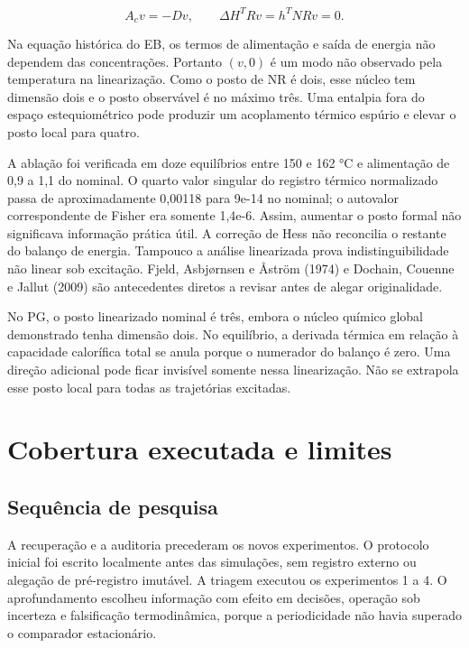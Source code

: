 \documentclass[
  11pt,
  letterpaper,
]{article}
\begin{document}
\[
A_cv=-Dv,\qquad \Delta H^TRv=h^TNRv=0.
\]

Na equação histórica do EB, os termos de alimentação e saída de energia
não dependem das concentrações. Portanto \((v,0)\) é um modo não
observado pela temperatura na linearização. Como o posto de NR é dois,
esse núcleo tem dimensão dois e o posto observável é no máximo três. Uma
entalpia fora do espaço estequiométrico pode produzir um acoplamento
térmico espúrio e elevar o posto local para quatro.

A ablação foi verificada em doze equilíbrios entre 150 e 162 °C e
alimentação de 0,9 a 1,1 do nominal. O quarto valor singular do registro
térmico normalizado passa de aproximadamente 0,00118 para 9e-14 no
nominal; o autovalor correspondente de Fisher era somente 1,4e-6. Assim,
aumentar o posto formal não significava informação prática útil. A
correção de Hess não reconcilia o restante do balanço de energia.
Tampouco a análise linearizada prova indistinguibilidade não linear sob
excitação. Fjeld, Asbjørnsen e Åström (1974) e Dochain, Couenne e Jallut
(2009) são antecedentes diretos a revisar antes de alegar originalidade.

No PG, o posto linearizado nominal é três, embora o núcleo químico
global demonstrado tenha dimensão dois. No equilíbrio, a derivada
térmica em relação à capacidade calorífica total se anula porque o
numerador do balanço é zero. Uma direção adicional pode ficar invisível
somente nessa linearização. Não se extrapola esse posto local para todas
as trajetórias excitadas.

\hypertarget{cobertura-executada-e-limites}{%
\section{Cobertura executada e
limites}\label{cobertura-executada-e-limites}}

\hypertarget{sequuxeancia-de-pesquisa}{%
\subsection{Sequência de pesquisa}\label{sequuxeancia-de-pesquisa}}

A recuperação e a auditoria precederam os novos experimentos. O
protocolo inicial foi escrito localmente antes das simulações, sem
registro externo ou alegação de pré-registro imutável. A triagem
executou os experimentos 1 a 4. O aprofundamento escolheu informação com
efeito em decisões, operação sob incerteza e falsificação termodinâmica,
porque a periodicidade não havia superado o comparador estacionário.
\end{document}
